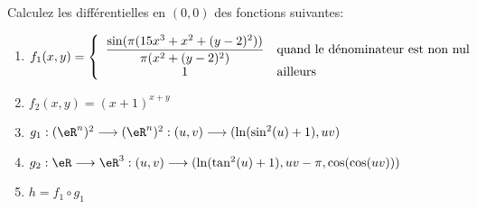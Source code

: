 
\begin{exercice}\label{exo0051}

Calculez les différentielles en  $(0,0)$ des fonctions suivantes:

\begin{enumerate}
\item $f_1(x,y)=\left\{\begin{array}{cl}
                        \dfrac{\sin(\pi(15x^3+x^2+(y-2)^2))}{\pi(x^2+(y-2)^2)} & {\rm quand \ le \ d\acute{e}nominateur \ est \ non \ nul}  \\
                        1             						    & {\rm ailleurs}
                        
                        \end{array}\right.$
\item $f_2(x,y)= (x+1)^{x+y}$
\item $g_1:(\eR^n)^2\longrightarrow(\eR^n)^2:(u,v)\longrightarrow(\ln(\sin^2(u)+1),uv)$
\item $g_2:\eR\longrightarrow\eR^3:(u,v)\longrightarrow(\ln(\tan^2(u)+1),uv-\pi, \cos(\cos(uv)))$
\item $h=f_1\circ g_1$
\end{enumerate}

\end{exercice}
